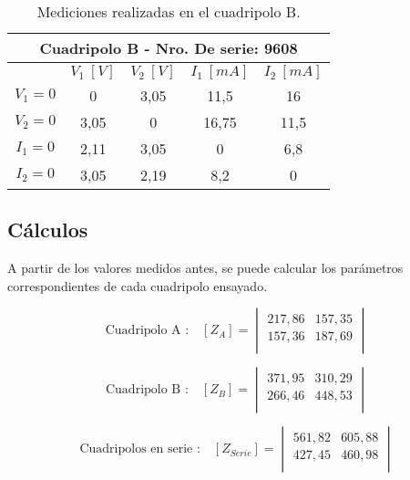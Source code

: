 \documentclass[a4paper]{article}
\begin{document}
\begin{table}[H]
\begin{center}
\begin{tabular}{|c|c|c|c|c|}
\hline
\multicolumn{5}{|c|}{Cuadripolo B - Nro. De serie: 9608} \\ \hline
 & $V_1 \ [V]$ & $V_2 \ [V]$ & $I_1 \ [mA]$ & $I_2 \ [mA]$ \\ \hline
$V_1 = 0$ & 0 & 3,05 & 11,5 & 16 \\ \hline
$V_2 = 0$ & 3,05 & 0 & 16,75 & 11,5 \\ \hline
$I_1 = 0$ & 2,11 & 3,05 & 0 & 6,8 \\ \hline
$I_2 = 0$ & 3,05 & 2,19 & 8,2 & 0 \\ \hline
\end{tabular}
\caption{Mediciones realizadas en el cuadripolo B.}
\end{center}
\end{table}

\subsection*{Cálculos}

A partir de los valores medidos antes, se puede calcular los parámetros correspondientes de cada cuadripolo ensayado.

\begin{equation}
\text{Cuadripolo A :}\quad [Z_{A}] =
\begin{vmatrix}
	217,86 & 157,35\\
	157,36 & 187,69\\
\end{vmatrix}
\end{equation}

\begin{equation}
\text{Cuadripolo B :}\quad [Z_{B}] =
\begin{vmatrix}
	371,95 & 310,29\\
	266,46 & 448,53\\
\end{vmatrix}
\end{equation}

\begin{equation}
\text{Cuadripolos en serie :}\quad [Z_{Serie}] =
\begin{vmatrix}
	561,82 & 605,88\\
	427,45 & 460,98\\
\end{vmatrix}
\end{equation}
\end{document}
